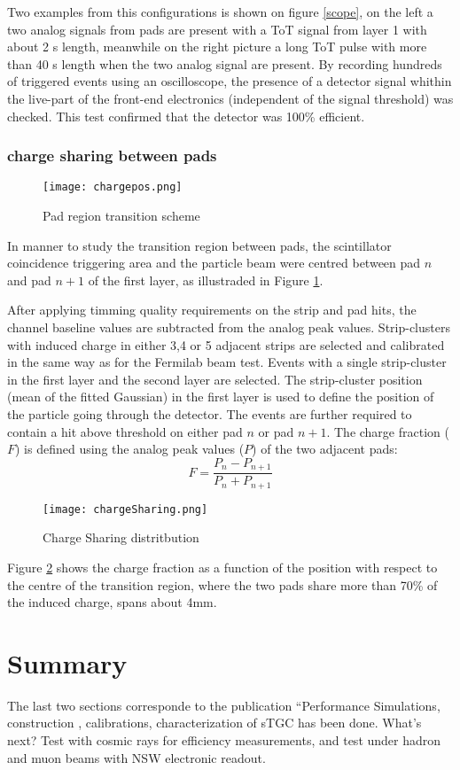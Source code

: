 Two examples from this configurations is shown on figure \ref{scope}, on the left a two analog signals from pads are
present with a ToT signal from layer 1 with about 2 \micro s length, meanwhile on the right picture a long ToT pulse with more
than 40 \micro s length when the two analog signal are present. By recording hundreds of triggered events using an
oscilloscope, the presence of a detector signal whithin the live-part of the front-end electronics (independent of the
signal threshold) was checked. This test confirmed that the detector was 100\% efficient.\par


\subsubsection{charge sharing between pads}
\begin{figure}[ht]
\centering
\texttt{[image: chargepos.png]}
\caption{Pad region transition scheme}\label{chargepos}
\end{figure}

In manner to study the transition region between pads, the scintillator coincidence triggering area and the particle
beam were centred between pad $n$ and pad $n+1$ of the first layer, as illustraded in Figure \ref{chargepos}.\par
After applying timming quality requirements on the strip and pad hits, the channel baseline values are subtracted from
the analog peak values. Strip-clusters with induced charge in either 3,4 or 5 adjacent strips are selected and
calibrated in the same way as for the Fermilab beam test. Events with a single strip-cluster in the first layer and the
second layer are selected. The strip-cluster position (mean of the fitted Gaussian) in the first layer is used to define
the position of the particle going through the detector. The events are further required to contain a hit above
threshold on either pad $n$ or pad $n+1$. The charge fraction ($F$) is defined using the analog peak values ($P$) of the two
adjacent pads:
\begin{equation}
F = \frac{P_n - P_{n+1}}{P_n + P_{n+1}}
\end{equation}

\begin{figure}[ht]
\centering
\texttt{[image: chargeSharing.png]}
\caption{Charge Sharing distritbution}\label{chargeSharing}
\end{figure}

Figure \ref{chargeSharing} shows the charge fraction as a function of the position with respect to the centre of the
transition region, where the two pads share more than 70\% of the induced charge, spans about \unit{4}{mm}.








\section{Summary}
The last two sections corresponde to the publication ``Performance
Simulations, construction , calibrations, characterization of sTGC has been done. 
What's next? Test with cosmic rays for efficiency measurements, and test under hadron and muon beams with NSW electronic
readout. 
